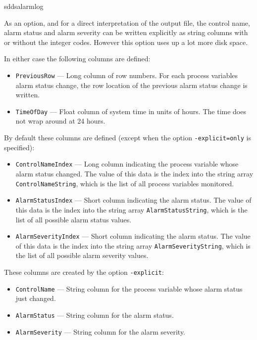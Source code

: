 \begin{sddsprog}{sddsalarmlog}
\begin{itemize}
As an option, and for a direct interpretation of the output file, the control
name, alarm status and alarm severity can be written explicitly as
string columns with or without the integer codes. However this
option uses up a lot more disk space.

In either case the following columns are defined:
\begin{itemize}
        \item {\tt PreviousRow} --- Long column of row numbers. For each 
        process variables alarm status change, the row location of the 
        previous alarm status change is written.                
        \item {\tt TimeOfDay} --- Float column of system time in units of hours. 
        The time does not wrap around at 24 hours.
\end{itemize}

By default these columns are defined (except when the option {\tt -explicit=only} is specified):
\begin{itemize}
        \item {\tt ControlNameIndex} --- Long column indicating the process variable whose
        alarm status changed. The value of this data is the index into the string array 
        {\tt ControlNameString}, which is the list of all process variables monitored.
        \item {\tt AlarmStatusIndex} --- Short column indicating the alarm status.
         The value of this data is the index into the string array 
        {\tt AlarmStatusString}, which is the list of all possible alarm status values.
        \item {\tt AlarmSeverityIndex} --- Short column indicating the alarm status.
        The value of this data is the index into the string array 
        {\tt AlarmSeverityString}, which is the list of all possible alarm severity values.
\end{itemize}

These columns are created by the option {\tt -explicit}:
\begin{itemize}
        \item {\tt ControlName} --- String column for the process variable whose alarm
        status just changed.
        \item {\tt AlarmStatus} --- String column for the alarm status. 
        \item {\tt AlarmSeverity} --- String column for the alarm severity. 
\end{itemize}


\end{itemize}
\end{sddsprog}
